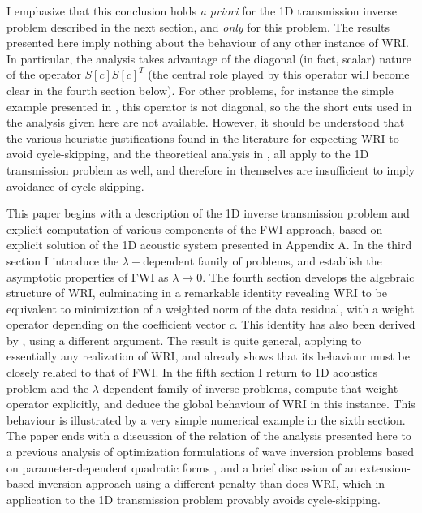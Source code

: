 I emphasize that this conclusion holds {\em a priori} for the 1D
transmission inverse problem described in the next section, and {\em
  only} for this problem. The results presented here imply nothing
about the behaviour of any other instance of WRI. In particular, the
analysis takes advantage of the diagonal (in fact, scalar) nature of
the operator $S[c]S[c]^T$ (the central role played by this operator
will become clear in the fourth section below). For other
problems, for instance the simple example presented in
\cite{Leeuwen2019note}, this operator is not diagonal, so the the
short cuts used in the analysis given here are not available. However,
it should be understood that the various heuristic justifications
found in the literature for expecting WRI to avoid cycle-skipping, and
the theoretical analysis in \cite{LeeuwenHerrmann:16}, all apply to
the 1D transmission problem as well, and therefore in themselves are
insufficient to imply avoidance of cycle-skipping.

This paper begins with a description of the 1D inverse transmission
problem and explicit computation of various components of the FWI
approach, based on explicit solution of the 1D acoustic system
presented in Appendix A. In the third section I introduce the
$\lambda-$dependent family of problems, and establish the asymptotic
properties of FWI as $\lambda \rightarrow 0$. The fourth section
develops the algebraic structure of WRI, culminating in a remarkable
identity revealing WRI to be equivalent to minimization of a weighted
norm of the data residual, with a weight operator depending on the
coefficient vector $c$. This identity has also been derived by
\cite{Leeuwen2019note}, using a different argument. The result is
quite general, applying to essentially any realization of WRI, and
already shows that its behaviour must be closely related to that of
FWI. In the fifth section I return to 1D acoustics problem and the
$\lambda$-dependent family of inverse problems, compute that weight
operator explicitly, and deduce the global behaviour of WRI in this
instance. This behaviour is illustrated by a very simple numerical
example in the sixth section. The paper ends with a discussion of the
relation of the analysis presented here to a previous analysis of
optimization formulations of wave inversion problems based on
parameter-dependent quadratic forms \cite[]{StolkSymes:03}, and a
brief discussion of an extension-based inversion approach using a different
penalty than does WRI, which in application to the 1D transmission
problem provably avoids cycle-skipping.

